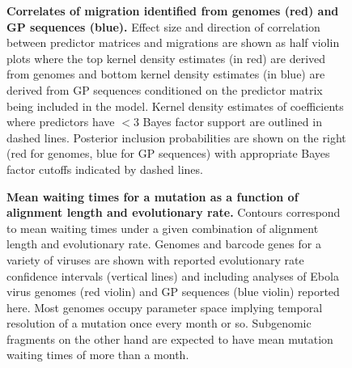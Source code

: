 \documentclass{bmcart}
\def\texttt{[image: ]}
\begin{document}
\begin{backmatter}
\begin{figure}[ht]
 \centering
	\caption{\textbf{Correlates of migration identified from genomes (red) and GP sequences (blue).}
  Effect size and direction of correlation between predictor matrices and migrations are shown as half violin plots where the top kernel density estimates (in red) are derived from genomes and bottom kernel density estimates (in blue) are derived from GP sequences conditioned on the predictor matrix being included in the model.
  Kernel density estimates of coefficients where predictors have $<$3 Bayes factor support are outlined in dashed lines.
  Posterior inclusion probabilities are shown on the right (red for genomes, blue for GP sequences) with appropriate Bayes factor cutoffs indicated by dashed lines.
	}
	\label{glm}
\end{figure}



\begin{figure}[h]
 \centering
	\caption{\textbf{Mean waiting times for a mutation as a function of alignment length and evolutionary rate.}
  Contours correspond to mean waiting times under a given combination of alignment length and evolutionary rate.
  Genomes and barcode genes for a variety of viruses are shown with reported evolutionary rate confidence intervals (vertical lines) and including analyses of Ebola virus genomes (red violin) and GP sequences (blue violin) reported here.
  Most genomes occupy parameter space implying temporal resolution of a mutation once every month or so.
  Subgenomic fragments on the other hand are expected to have mean mutation waiting times of more than a month.
	}
	\label{contours}
\end{figure}


%
%



\end{backmatter}
\end{document}
